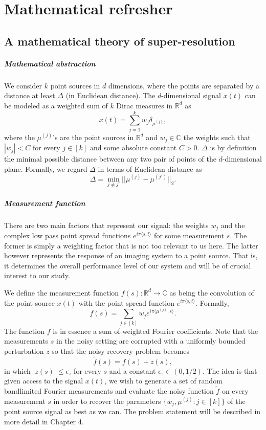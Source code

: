 \chapter{Mathematical refresher}
\section{A mathematical theory of super-resolution}
\paragraph{Mathematical abstraction} We consider $k$ point sources in $d$ dimensions, where the points are separated by a distance at least $\Delta$ (in Euclidean distance). The $d$-dimensional signal $x(t)$ can be modeled as a weighted sum of $k$ Dirac measures in $\mathbb{R}^d$ as $$x(t)=\sum_{j=1}^k w_j\delta_{\mu^{(j)}},$$ where the $\mu^{(j)}$'s are the point sources in $\mathbb{R}^d$ and $w_j\in\mathbb{C}$ the weights such that $|w_j|<C$ for every $j\in[k]$ and some absolute constant $C>0$. $\Delta$ is by definition the minimal possible distance between any two pair of points of the $d$-dimensional plane. Formally, we regard $\Delta$ in terms of Euclidean distance as $$\Delta=\min_{j\neq j'}||\mu^{(j)}-\mu^{(j')}||_2.$$
\paragraph{Measurement function} There are two main factors that represent our signal: the weights $w_j$ and the complex low pass point spread functions $e^{i\pi\langle s,t\rangle}$ for some measurement $s$. The former is simply a weighting factor that is not too relevant to us here. The latter however represents the response of an imaging system to a point source. That is, it determines the overall performance level of our system and will be of crucial interest to our study.\par 
We define the measurement function $f(s):\mathbb{R}^d\to\mathbb{C}$ as being the convolution of the point source $x(t)$ with the point spread function $e^{i\pi\langle s,t\rangle}$. Formally, $$f(s)=\sum_{j\in[k]}w_je^{i\pi\langle\mu^{(j)},s\rangle}.$$ The function $f$ is in essence a sum of weighted Fourier coefficients. Note that the measurements $s$ in the noisy setting are corrupted with a uniformly bounded perturbation $z$ so that the noisy recovery problem becomes $$\widetilde{f}(s)=f(s)+z(s),$$ in which $|z(s)|\leq\epsilon_z$ for every $s$ and a constant $\epsilon_z\in(0,1/2)$. The idea is that given access to the signal $x(t)$, we wish to generate a set of random bandlimited Fourier measurements and evaluate the noisy function $\widetilde{f}$ on every measurement $s$ in order to recover the parameters $\{w_j,\mu^{(j)}:j\in[k]\}$ of the point source signal as best as we can. The problem statement will be described in more detail in Chapter 4.

